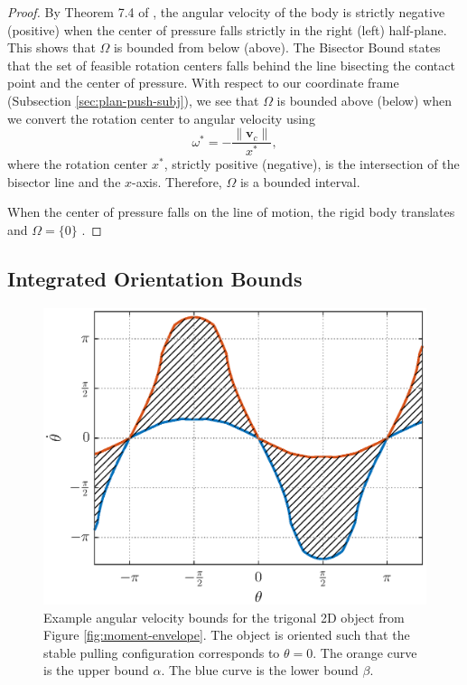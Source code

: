 \documentclass[conference]{IEEEtran}
\begin{document}
\begin{proof}
  By Theorem 7.4 of \cite{Mason}, the angular velocity of the body is
  strictly negative (positive) when the center of pressure falls
  strictly in the right (left) half-plane. This shows that $\Omega$ is
  bounded from below (above). The Bisector Bound \cite{Mason} states
  that the set of feasible rotation centers falls behind the line
  bisecting the contact point and the center of pressure. With respect
  to our coordinate frame (Subsection \ref{sec:plan-push-subj}), we
  see that $\Omega$ is bounded above (below) when we convert the
  rotation center to angular velocity using
  \begin{equation}
    \omega^* = -\frac{\lVert\mathbf{v}_c\rVert}{x^*}, \label{eq:rot-to-ang}
  \end{equation}
  where the rotation center $x^*$, strictly positive (negative), is
  the intersection of the bisector line and the $x$-axis. Therefore,
  $\Omega$ is a bounded interval.

  When the center of pressure falls on the line of motion, the rigid
  body translates and $\Omega = \{0\}$ \cite{Mason}.
\end{proof}

\subsection{Integrated Orientation Bounds}\label{sec:orientation-bounds}

\begin{figure}[t]
  \centering
    \includegraphics[width=1\linewidth]{fig/omega_bounds_1}
    \caption{Example angular velocity bounds for the trigonal 2D object from Figure \ref{fig:moment-envelope}. The object is oriented such that the stable pulling configuration corresponds to $\theta=0$. The orange curve is the upper bound $\alpha$. The blue curve is the lower bound $\beta$.}
  \label{fig:omega-bounds}
\end{figure}
\end{document}
